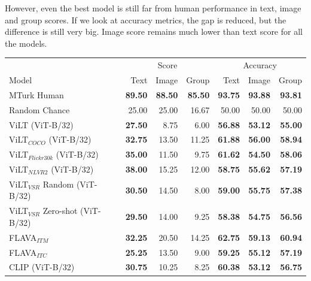 However, even the best model is still far from human performance in text, image and group scores. If we look at accuracy metrics, the gap is reduced, but the difference is still very big. Image score remains much lower than text score for all the models.

\begin{table}[ht]
\centering
\begin{tabular}{l|rrr|rrr}
\toprule
 &
  \multicolumn{3}{c|}{{Score}} &
  \multicolumn{3}{c}{{Accuracy}} \\
 Model                               & Text           & Image          & Group          & Text       & Image      & Group      \\
\midrule
 MTurk Human                         & \textbf{89.50} & \textbf{88.50} & \textbf{85.50} & \textbf{93.75} & \textbf{93.88} & \textbf{93.81} \\
 Random Chance                       & 25.00          & 25.00          & 16.67          & 50.00          & 50.00          & 50.00          \\
 \midrule
 ViLT (ViT-B/32)                     & \textbf{27.50} & 8.75           & 6.00           & \textbf{56.88} & \textbf{53.12} & \textbf{55.00} \\
 ViLT$_{COCO}$ (ViT-B/32)            & \textbf{32.75} & 13.50          & 11.25          & \textbf{61.88} & \textbf{56.00} & \textbf{58.94} \\
 ViLT$_{Flickr30k}$ (ViT-B/32)       & \textbf{35.00} & 11.50          & 9.75           & \textbf{61.62} & \textbf{54.50} & \textbf{58.06} \\
 ViLT$_{NLVR2}$ (ViT-B/32)           & \textbf{38.00} & 15.25          & 12.00          & \textbf{58.75} & \textbf{55.62} & \textbf{57.19} \\
 ViLT$_{VSR}$ Random (ViT-B/32)      & \textbf{30.50} & 14.50          & 8.00           & \textbf{59.00} & \textbf{55.75} & \textbf{57.38} \\
 ViLT$_{VSR}$ Zero-shot (ViT-B/32)   & \textbf{29.50} & 14.00          & 9.25           & \textbf{58.38} & \textbf{54.75} & \textbf{56.56} \\
 FLAVA$_{ITM}$                       & \textbf{32.25} & 20.50          & 14.25          & \textbf{62.75} & \textbf{59.13} & \textbf{60.94} \\
 FLAVA$_{ITC}$                       & \textbf{25.25} & 13.50          & 9.00           & \textbf{59.25} & \textbf{55.12} & \textbf{57.19} \\
 CLIP (ViT-B/32)                     & \textbf{30.75} & 10.25          & 8.25           & \textbf{60.38} & \textbf{53.12} & \textbf{56.75} \\

\end{tabular}
\end{table}
